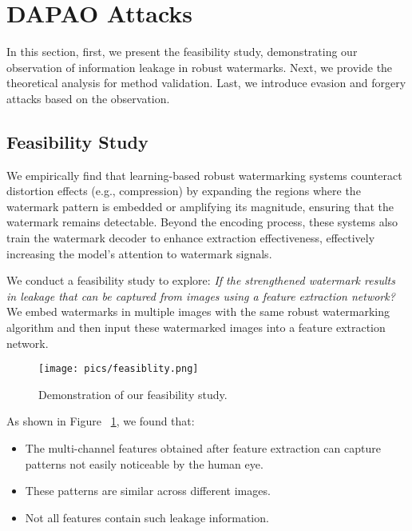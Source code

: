\section{DAPAO Attacks}
In this section, first, we present the feasibility study, demonstrating our observation of information leakage in robust watermarks. Next, we provide the theoretical analysis for method validation. Last, we introduce evasion and forgery attacks based on the observation.


\subsection{Feasibility Study}\label{sec:pilot}
We empirically find that learning-based robust watermarking systems counteract distortion effects (e.g., compression) by expanding the regions where the watermark pattern is embedded or amplifying its magnitude, ensuring that the watermark remains detectable. Beyond the encoding process, these systems also train the watermark decoder to enhance extraction effectiveness, effectively increasing the model's attention to watermark signals.

We conduct a feasibility study to explore: \emph{If the strengthened watermark results in leakage that can be captured from images using a feature extraction network?} We embed watermarks in multiple images with the same robust watermarking algorithm and then input these watermarked images into a feature extraction network.

\begin{figure}[!t]
    \centering
    \texttt{[image: pics/feasiblity.png]}   
    \vspace{-6mm}
    \caption{Demonstration of our feasibility study.}
    \label{fig:feasibility}
    \vspace{-3mm}
\end{figure}

As shown in Figure ~\ref{fig:feasibility}, we found that:
\begin{itemize}
    \item The multi-channel features obtained after feature extraction can capture patterns not easily noticeable by the human eye.
    \item These patterns are similar across different images.
    \item Not all features contain such leakage information.
\end{itemize}

